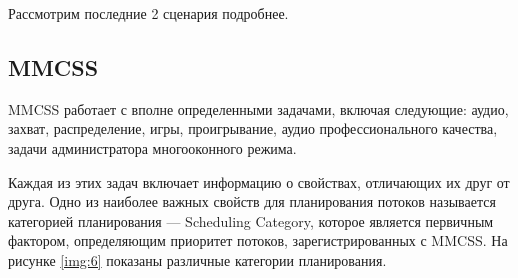 \documentclass[a4paper,oneside,14pt]{extarticle}
\begin{document}
Рассмотрим последние 2 сценария подробнее. 





\subsection*{MMCSS}

MMCSS работает с вполне определенными задачами, включая следующие: аудио, захват, распределение, игры, проигрывание, аудио профессионального качества, задачи администратора многооконного режима.

Каждая из этих задач включает информацию о свойствах, отличающих их друг от друга.
Одно из наиболее важных свойств для планирования потоков называется категорией планирования --- Scheduling Category, которое является первичным фактором, определяющим приоритет потоков, зарегистрированных с MMCSS.
На рисунке \ref{img:6} показаны различные категории планирования.
\end{document}
